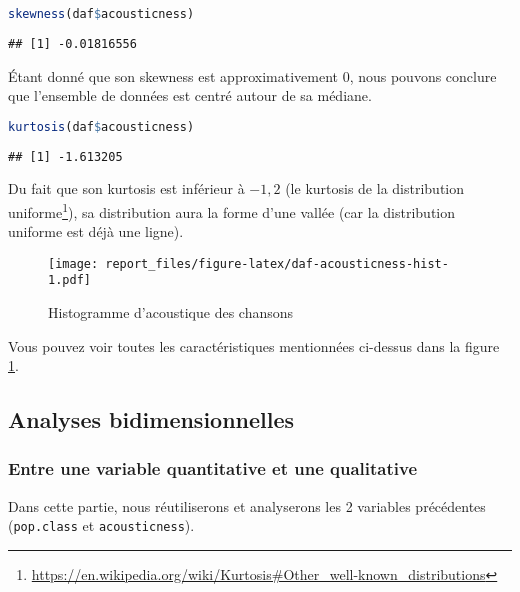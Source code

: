 \documentclass[
  12pt,
  xcolor = usenames,dvipsnames]{article}
\newcommand{\passthrough}[1]{#1}
\begin{document}
\begin{lstlisting}[language=R]
skewness(daf$acousticness)
\end{lstlisting}

\begin{lstlisting}
## [1] -0.01816556
\end{lstlisting}

Étant donné que son skewness est approximativement 0, nous pouvons conclure que
l'ensemble de données est centré autour de sa médiane.

\begin{lstlisting}[language=R]
kurtosis(daf$acousticness)
\end{lstlisting}

\begin{lstlisting}
## [1] -1.613205
\end{lstlisting}

Du fait que son kurtosis est inférieur à \(-1,2\) (le kurtosis de la distribution uniforme\footnote{\url{https://en.wikipedia.org/wiki/Kurtosis\#Other_well-known_distributions}}),
sa distribution aura la forme d'une vallée (car la distribution uniforme est déjà une ligne).

\begin{figure}
\centering
\texttt{[image: report\_files/figure-latex/daf-acousticness-hist-1.pdf]}
\caption{\label{fig:daf-acousticness-hist}Histogramme d'acoustique des chansons}
\end{figure}

Vous pouvez voir toutes les caractéristiques mentionnées ci-dessus dans la figure \ref{fig:daf-acousticness-hist}.

\hypertarget{analyses-bidimensionnelles}{%
\subsection{Analyses bidimensionnelles}\label{analyses-bidimensionnelles}}

\hypertarget{entre-une-variable-quantitative-et-une-qualitative}{%
\subsubsection{Entre une variable quantitative et une qualitative}\label{entre-une-variable-quantitative-et-une-qualitative}}

Dans cette partie, nous réutiliserons et analyserons les 2 variables précédentes (\passthrough{\lstinline!pop.class!} et \passthrough{\lstinline!acousticness!}).
\end{document}
